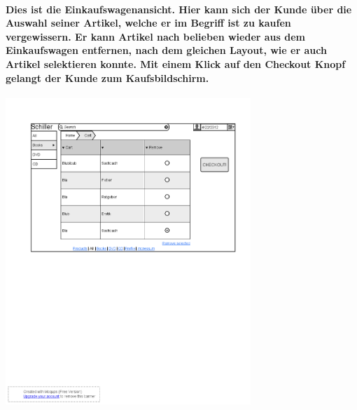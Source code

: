 \documentclass[a4paper]{article}
\begin{document}
\paragraph{Dies ist die Einkaufswagenansicht. Hier kann sich der Kunde über die Auswahl seiner Artikel, welche er im Begriff ist zu kaufen vergewissern. Er kann Artikel nach belieben wieder aus dem Einkaufswagen entfernen, nach dem gleichen Layout, wie er auch Artikel selektieren konnte. Mit einem Klick auf den Checkout Knopf gelangt der Kunde zum Kaufsbildschirm.\\}
\includegraphics[width=350px]{8CartView.png}
\end{document}

